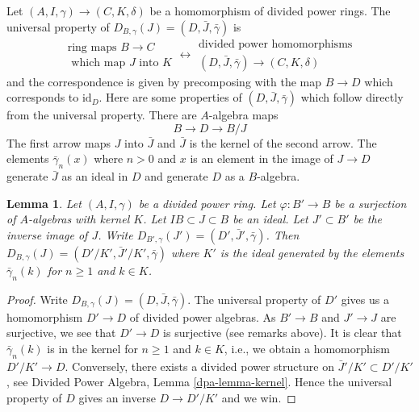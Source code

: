 \documentclass{stacks-project}
\theoremstyle{plain}
\newtheorem{lemma}[subsection]{Lemma}
\theoremstyle{definition}
\theoremstyle{remark}
\numberwithin{equation}{subsection}
\begin{document}
\noindent
Let $(A, I, \gamma) \to (C, K, \delta)$ be a homomorphism of divided
power rings. The universal property of
$D_{B, \gamma}(J) = (D, \bar J, \bar \gamma)$ is
$$
\begin{matrix}
\text{ring maps }B \to C \\
\text{ which map }J\text{ into }K
\end{matrix}
\longleftrightarrow
\begin{matrix}
\text{divided power homomorphisms} \\
(D, \bar J, \bar \gamma) \to (C, K, \delta)
\end{matrix}
$$
and the correspondence is given by precomposing with the map $B \to D$
which corresponds to $\text{id}_D$. Here are some properties of
$(D, \bar J, \bar \gamma)$ which follow directly from the universal
property. There are $A$-algebra maps
\begin{equation}
\label{equation-divided-power-envelope}
B \longrightarrow D \longrightarrow B/J
\end{equation}
The first arrow maps $J$ into $\bar J$ and $\bar J$ is the kernel
of the second arrow. The elements $\bar\gamma_n(x)$ where $n > 0$
and $x$ is an element in the image of $J \to D$ generate $\bar J$
as an ideal in $D$ and generate $D$ as a $B$-algebra.

\begin{lemma}
\label{lemma-divided-power-envelop-quotient}
Let $(A, I, \gamma)$ be a divided power ring.
Let $\varphi : B' \to B$ be a surjection of $A$-algebras with kernel $K$.
Let $IB \subset J \subset B$ be an ideal. Let $J' \subset B'$
be the inverse image of $J$. Write
$D_{B', \gamma}(J') = (D', \bar J', \bar\gamma)$.
Then $D_{B, \gamma}(J) = (D'/K', \bar J'/K', \bar\gamma)$
where $K'$ is the ideal generated by the elements $\bar\gamma_n(k)$
for $n \geq 1$ and $k \in K$.
\end{lemma}

\begin{proof}
Write $D_{B, \gamma}(J) = (D, \bar J, \bar \gamma)$.
The universal property of $D'$ gives us a homomorphism $D' \to D$
of divided power algebras. As $B' \to B$ and $J' \to J$ are surjective, we
see that $D' \to D$ is surjective (see remarks above). It is clear that
$\bar\gamma_n(k)$ is in the kernel for $n \geq 1$ and $k \in K$, i.e.,
we obtain a homomorphism $D'/K' \to D$. Conversely, there exists a divided
power structure on $\bar J'/K' \subset D'/K'$, see
Divided Power Algebra, Lemma \ref{dpa-lemma-kernel}.
Hence the universal property of $D$ gives an inverse $D \to D'/K'$ and we win.
\end{proof}
\end{document}
